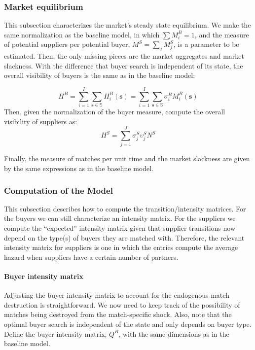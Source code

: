 \documentclass[12pt]{article} \usepackage{amsmath,amssymb,amsthm,geometry,graphicx,setspace,algorithm,algpseudocode,float}
\newcommand{\subsubsubsection}[1]{\paragraph{#1}}
\begin{document}
\subsubsection{Market equilibrium}

This subsection characterizes the market's steady state equilibrium. We make the same normalization as the baseline model, in which $\sum M_i^B = 1$, and the measure of potential suppliers per potential buyer, $M^S = \sum_j M_j^S$, is a parameter to be estimated. Then, the only missing pieces are the market aggregates and market slackness. With the difference that buyer search is independent of its state, the overall visibility of buyers is the same as in the baseline model:

\begin{equation}
    H^B = \sum_{i=1}^{I} \sum_{\mathbf{s}\in \mathbb{S}} H_i^B(\mathbf{s})  = \sum_{i=1}^{I} \sum_{\mathbf{s}\in \mathbb{S}} \sigma_i^B  M_i^B(\mathbf{s}) 
\end{equation}
Then, given the normalization of the buyer measure, compute the overall visibility of suppliers as:
\begin{equation}
    H^S = \sum_{j=1}^{J} \sigma_j^S \upsilon_j^S N^S
\end{equation}

Finally, the measure of matches per unit time and the market slackness are given by the same expressions as in the baseline model.

\subsubsection{Computation of the Model}

This subsection describes how to compute the transition/intensity matrices. For the buyers we can still characterize an intensity matrix. For the suppliers we compute the ``expected'' intensity matrix given that supplier transitions now depend on the type(s) of buyers they are matched with. Therefore, the relevant intensity matrix for suppliers is one in which the entries compute the average hazard when suppliers have a certain number of partners. 

\subsubsubsection{Buyer intensity matrix}

Adjusting the buyer intensity matrix to account for the endogenous match destruction is straightforward. We now need to keep track of the possibility of matches being destroyed from the match-specific shock. Also, note that the optimal buyer search is independent of the state and only depends on buyer type. Define the buyer intensity matrix, $Q^B$, with the same dimensions as in the baseline model. 
\end{document}
